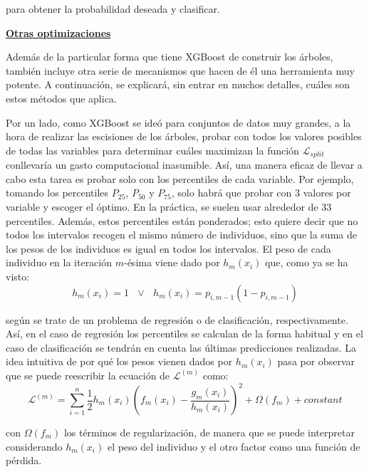 \documentclass[12pt,twoside]{article}
\begin{document}
\noindent
para obtener la probabilidad deseada y clasificar.

\bigskip \bigskip

\textbf{\underline{Otras optimizaciones}}

Además de la particular forma que tiene XGBoost de construir los árboles, también incluye otra serie de mecanismos que hacen de él una herramienta muy potente. A continuación, se explicará, sin entrar en muchos detalles, cuáles son estos métodos que aplica.

Por un lado, como XGBoost se ideó para conjuntos de datos muy grandes, a la hora de realizar las escisiones de los árboles, probar con todos los valores posibles de todas las variables para determinar cuáles maximizan la función $\mathcal{L}_{split}$ conllevaría un gasto computacional inasumible. Así, una manera eficaz de llevar a cabo esta tarea es probar solo con los percentiles de cada variable. Por ejemplo, tomando los percentiles $P_{25}$, $P_{50}$ y $P_{75}$, solo habrá que probar con 3 valores por variable y escoger el óptimo. En la práctica, se suelen usar alrededor de 33 percentiles. Además, estos percentiles están ponderados; esto quiere decir que no todos los intervalos recogen el mismo número de individuos, sino que la suma de los pesos de los individuos es igual en todos los intervalos. El peso de cada individuo en la iteración $m$-ésima viene dado por $h_m(x_i)$ que, como ya se ha visto:
\begin{equation*}
h_m(x_i) = 1 \, \, \, \, \vee \, \, \, \, h_m(x_i) = p_{i, m-1}(1 - p_{i, m-1})
\end{equation*}

\noindent
según se trate de un problema de regresión o de clasificación, respectivamente. Así, en el caso de regresión los percentiles se calculan de la forma habitual y en el caso de clasificación se tendrán en cuenta las últimas predicciones realizadas. La idea intuitiva de por qué los pesos vienen dados por $h_m(x_i)$ pasa por observar que se puede reescribir la ecuación de $\mathcal{L}^{(m)}$ como:
\begin{equation*}
\mathcal{L}^{(m)} = \sum_{i = 1}^n \frac{1}{2} h_m(x_i) \left( f_m(x_i) - \frac{g_m(x_i)}{h_m(x_i)} \right)^2 + \Omega(f_m) + constant
\end{equation*}

\noindent
con $\Omega(f_m)$ los términos de regularización, de manera que se puede interpretar considerando $h_m(x_i)$ el peso del individuo y el otro factor como una función de pérdida.
\end{document}
